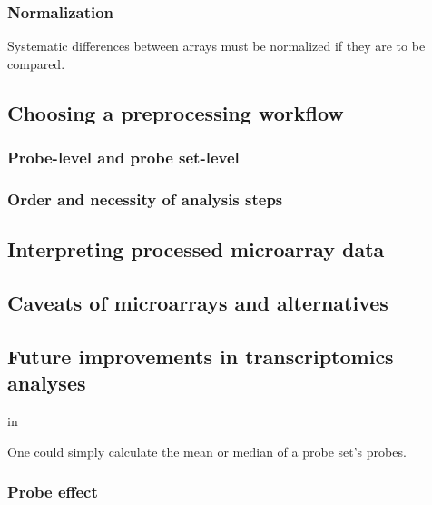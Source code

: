 \subsubsection{Normalization}

Systematic differences between arrays must be normalized if they
are to be compared.





\subsection{Choosing a preprocessing workflow}

\subsubsection{Probe-level and probe set-level}

\subsubsection{Order and necessity of analysis steps}

\subsection{Interpreting processed microarray data}

\subsection{Caveats of microarrays and alternatives}

\subsection{Future improvements in transcriptomics analyses}





in 



One could simply calculate the mean or median
of a probe set's probes.











\subsubsection{Probe effect}

